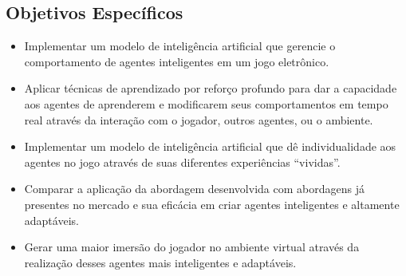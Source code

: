 \subsection{Objetivos Específicos}
\begin{itemize}
    \item Implementar um modelo de inteligência artificial que gerencie o comportamento de agentes inteligentes em um jogo eletrônico.
    \item Aplicar técnicas de aprendizado por reforço profundo para dar a capacidade aos agentes de aprenderem e modificarem seus comportamentos em tempo real através da interação com o jogador, outros agentes, ou o ambiente.
    \item Implementar um modelo de inteligência artificial que dê individualidade aos agentes no jogo através de suas diferentes experiências “vividas”.
    \item Comparar a aplicação da abordagem desenvolvida com abordagens já presentes no mercado e sua eficácia em criar agentes inteligentes e altamente adaptáveis.
    \item Gerar uma maior imersão do jogador no ambiente virtual através da realização desses agentes mais inteligentes e adaptáveis.
\end{itemize}